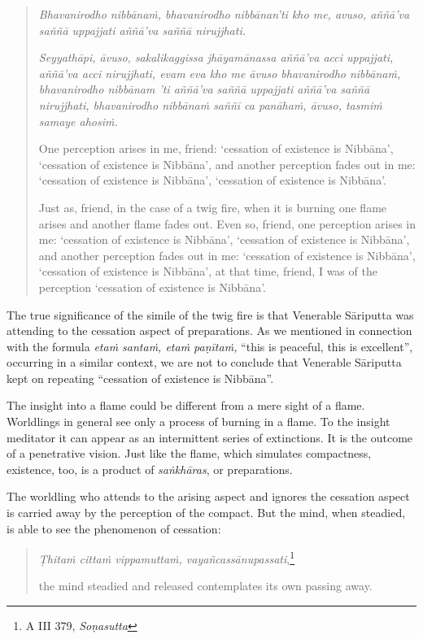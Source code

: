 \begin{quote}
\emph{Bhavanirodho nibbānaṁ, bhavanirodho nibbānan'ti kho me, avuso, aññā'va saññā uppajjati aññā'va saññā nirujjhati.}

\emph{Seyyathāpi, āvuso, sakalikaggissa jhāyamānassa aññā'va acci uppajjati, aññā'va acci nirujjhati, evam eva kho me āvuso bhavanirodho nibbānaṁ, bhavanirodho nibbānam 'ti aññā'va saññā uppajjati aññā'va saññā nirujjhati, bhavanirodho nibbānaṁ saññī ca panāhaṁ, āvuso, tasmiṁ samaye ahosiṁ.}

One perception arises in me, friend: `cessation of existence is Nibbāna', `cessation of existence is Nibbāna', and another perception fades out in me: `cessation of existence is Nibbāna', `cessation of existence is Nibbāna'.

Just as, friend, in the case of a twig fire, when it is burning one flame arises and another flame fades out. Even so, friend, one perception arises in me: `cessation of existence is Nibbāna', `cessation of existence is Nibbāna', and another perception fades out in me: `cessation of existence is Nibbāna', `cessation of existence is Nibbāna', at that time, friend, I was of the perception `cessation of existence is Nibbāna'.
\end{quote}

The true significance of the simile of the twig fire is that Venerable Sāriputta was attending to the cessation aspect of preparations. As we mentioned in connection with the formula \emph{etaṁ santaṁ, etaṁ paṇītaṁ,} ``this is peaceful, this is excellent'', occurring in a similar context, we are not to conclude that Venerable Sāriputta kept on repeating ``cessation of existence is Nibbāna''.

The insight into a flame could be different from a mere sight of a flame. Worldlings in general see only a process of burning in a flame. To the insight meditator it can appear as an intermittent series of extinctions. It is the outcome of a penetrative vision. Just like the flame, which simulates compactness, existence, too, is a product of \emph{saṅkhāras}, or preparations.

The worldling who attends to the arising aspect and ignores the cessation aspect is carried away by the perception of the compact. But the mind, when steadied, is able to see the phenomenon of cessation:

\begin{quote}
\emph{Ṭhitaṁ cittaṁ vippamuttaṁ, vayañcassānupassati},\footnote{A III 379, \emph{Soṇasutta}}

the mind steadied and released contemplates its own passing away.
\end{quote}

